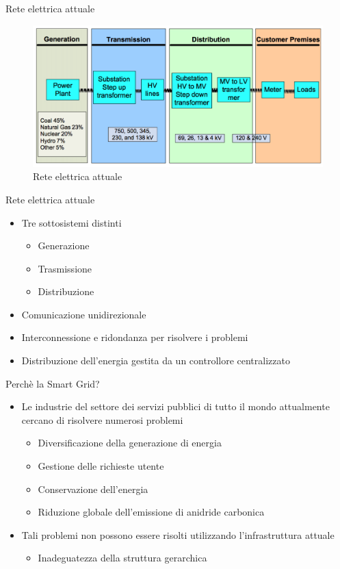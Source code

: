 \begin{frame}{Rete elettrica attuale}
	\begin{figure}[h] 
		\includegraphics[scale=0.25]{imgs/elect_grid.png}
		\caption{Rete elettrica attuale}
	\end{figure}
\end{frame}

\begin{frame}{Rete elettrica attuale}
	\begin{itemize}[<+- | alert@+>]
	\item Tre sottosistemi distinti
		\begin{itemize}
		\item Generazione
		\item Trasmissione
		\item Distribuzione
		\end{itemize}
	\item Comunicazione unidirezionale
	\item Interconnessione e ridondanza per risolvere i problemi
	\item Distribuzione dell'energia gestita da un controllore centralizzato
	\end{itemize}
\end{frame}

\begin{frame}{Perchè la Smart Grid?}
	\begin{itemize}[<+- | alert@+>]
	\item Le industrie del settore dei servizi pubblici di tutto il mondo attualmente cercano di risolvere numerosi problemi
		\begin{itemize}
		\item Diversificazione della generazione di energia
		\item Gestione delle richieste utente
		\item Conservazione dell’energia
		\item Riduzione globale dell’emissione di anidride carbonica
		\end{itemize}
	\item Tali problemi non possono essere risolti utilizzando l'infrastruttura attuale
		\begin{itemize}
			\item Inadeguatezza della struttura gerarchica
		\end{itemize}
	\end{itemize}
\end{frame}

